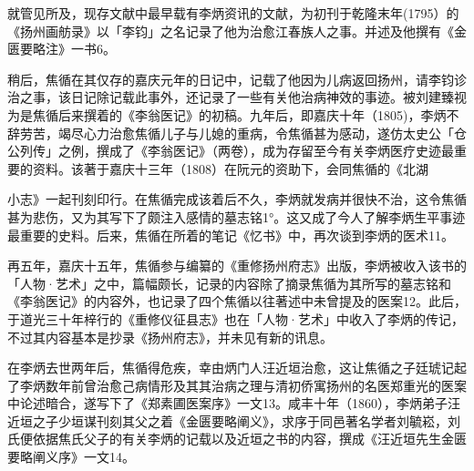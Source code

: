 就管见所及，现存文献中最早载有李炳资讯的文献，为初刊于乾隆末年(1795）的《扬州画舫录》以「李钧」之名记录了他为治愈江春族人之事。并述及他撰有《金匮要略注》一书6。

稍后，焦循在其仅存的嘉庆元年的日记中，记载了他因为儿病返回扬州，请李钧诊治之事，该日记除记载此事外，还记录了一些有关他治病神效的事迹。被刘建臻视为是焦循后来撰着的《李翁医记》的初稿。九年后，即嘉庆十年（1805)，李炳不辞劳苦，竭尽心力治愈焦循儿子与儿媳的重病，令焦循甚为感动，遂仿太史公「仓公列传」之例，撰成了《李翁医记》（两卷），成为存留至今有关李炳医疗史迹最重要的资料。该著于嘉庆十三年（1808）在阮元的资助下，会同焦循的《北湖

\vfill
\begin{BookNotes}
\end{BookNotes}

\noindent 小志》一起刊刻印行。在焦循完成该着后不久，李炳就发病并很快不治，这令焦循甚为悲伤，又为其写下了颇注入感情的墓志铭1°。这又成了今人了解李炳生平事迹最重要的史料。后来，焦循在所着的笔记《忆书》中，再次谈到李炳的医术11。

再五年，嘉庆十五年，焦循参与编纂的《重修扬州府志》出版，李炳被收入该书的「人物·艺术」之中，篇幅颇长，记录的内容除了摘录焦循为其所写的墓志铭和《李翁医记》的内容外，也记录了四个焦循以往著述中未曾提及的医案12。此后，于道光三十年梓行的《重修仪征县志》也在「人物·艺术」中收入了李炳的传记，不过其内容基本是抄录《扬州府志》，并未见有新的讯息。

在李炳去世两年后，焦循得危疾，幸由炳门人汪近垣治愈，这让焦循之子廷琥记起了李炳数年前曾治愈己病情形及其其治病之理与清初侨寓扬州的名医郑重光的医案中论述暗合，遂写下了《郑素圃医案序》一文13。咸丰十年（1860），李炳弟子汪近垣之子少垣谋刊刻其父之着《金匮要略阐义》，求序于同邑著名学者刘毓崧，刘氏便依据焦氏父子的有关李炳的记载以及近垣之书的内容，撰成《汪近垣先生金匮要略阐义序》一文14。

